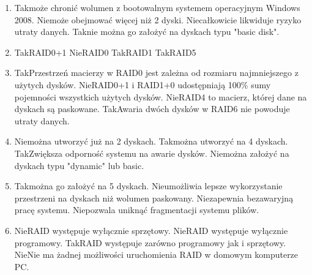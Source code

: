 \begin{enumerate}
		{Nie}{konfiguracja typu stripped volume}%
		{Tak}{konfiguracja typu RAID5}%
		{Tak}{konfiguracja typu mirror}%
		{Nie}{konfiguracja typu spanned volume}
		\item {}%
		{Tak}{może chronić wolumen z bootowalnym systemem operacyjnym Windows 2008.}%
		{Nie}{może obejmować więcej niż 2 dyski.}%
		{Nie}{całkowicie likwiduje ryzyko utraty danych.}%
		{Tak}{nie można go założyć na dyskach typu "basic disk".}
		\item {}%
		{Tak}{RAID0+1}%
		{Nie}{RAID0}%
		{Tak}{RAID1}%
		{Tak}{RAID5}
		\item {}%
		{Tak}{Przestrzeń macierzy w RAID0 jest zależna od rozmiaru najmniejszego z użytych dysków.}%
		{Nie}{RAID0+1 i RAID1+0 udostępniają 100\% sumy pojemności wszystkich użytych dysków.}%
		{Nie}{RAID4 to macierz, której dane na dyskach są paskowane.}%
		{Tak}{Awaria dwóch dysków w RAID6 nie powoduje utraty danych.}
		\item {}%
		{Nie}{można utworzyć już na 2 dyskach.}%
		{Tak}{można utworzyć na 4 dyskach.}%
		{Tak}{Zwiększa odporność systemu na awarie dysków.}%
		{Nie}{można założyć na dyskach typu "dynamic" lub basic.}
		\item {}%
		{Tak}{można go założyć na 5 dyskach.}%
		{Nie}{umożliwia lepsze wykorzystanie przestrzeni na dyskach niż wolumen paskowany.}%
		{Nie}{zapewnia bezawaryjną pracę systemu.}%
		{Nie}{pozwala uniknąć fragmentacji systemu plików.}
		\item {}%
		{Nie}{RAID występuje wyłącznie sprzętowy.}%
		{Nie}{RAID występuje wyłącznie programowy.}%
		{Tak}{RAID występuje zarówno programowy jak i sprzętowy.}%
		{Nie}{Nie ma żadnej możliwości uruchomienia RAID w domowym komputerze PC.}
		

\end{enumerate}
